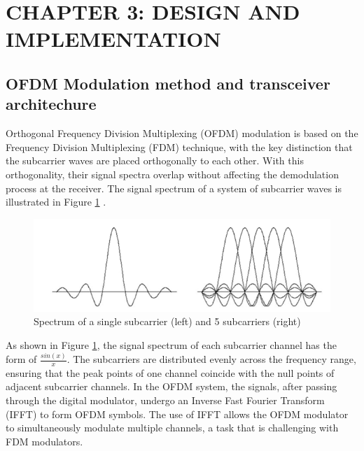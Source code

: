 \section*{CHAPTER 3:  DESIGN AND IMPLEMENTATION}
\setcounter{section}{3}
\setcounter{subsection}{0}
\setcounter{figure}{0}
\setcounter{table}{0}

\subsection{OFDM Modulation method and transceiver architechure}
Orthogonal Frequency Division Multiplexing (OFDM) modulation is based on the Frequency Division Multiplexing (FDM) technique, with the key distinction that the subcarrier waves are placed orthogonally to each other. With this orthogonality, their signal spectra overlap without affecting the demodulation process at the receiver. The signal spectrum of a system of subcarrier waves is illustrated in Figure \ref{Spectrum} \cite{b6}.

\begin{figure}[htbp]
    \centering
    \includegraphics[width=\textwidth]{Figures/Spectrum}
    \caption{Spectrum of a single subcarrier (left) and 5 subcarriers (right)}
    \label{Spectrum}    
\end{figure}

As shown in Figure \ref{Spectrum}, the signal spectrum of each subcarrier channel has the form of $\frac{sin(x)}{x}$. The subcarriers are distributed evenly across the frequency range, ensuring that the peak points of one channel coincide with the null points of adjacent subcarrier channels. In the OFDM system, the signals, after passing through the digital modulator, undergo an Inverse Fast Fourier Transform (IFFT) to form OFDM symbols. The use of IFFT allows the OFDM modulator to simultaneously modulate multiple channels, a task that is challenging with FDM modulators.

